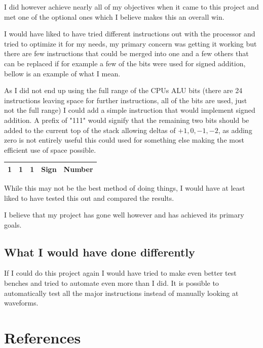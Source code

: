 \documentclass	[a4paper, 10pt]	{article}
\begin{document}
    I did however achieve nearly all of my objectives when it came to this project and
    met one of the optional ones which I believe makes this an overall win.

    I would have liked to have tried different instructions out with the processor and
    tried to optimize it for my needs, my primary concern was getting it working but
    there are few instructions that could be merged into one and a few others that can
    be replaced if for example a few of the bits were used for signed addition, bellow
    is an example of what I mean.

    As I did not end up using the full range of the CPUs ALU bits (there are 24 instructions
    leaving space for further instructions, all of the bits are used, just not the full range)
    I could add a simple instruction that would implement signed addition. A prefix of "111"
    would signify that the remaining two bits should be added to the current top of the stack
    allowing deltas of $+1,0,-1,-2$, as adding zero is not entirely useful this could used for
    something else making the most efficient use of space possible.

    \begin{center}
      \begin{tabular}{l | c | c | c | r }
        \hline
        1 & 1 & 1 & Sign & Number \\
        \hline
      \end{tabular}
    \end{center}

    While this may not be the best method of doing things, I would have at least liked to
    have tested this out and compared the results.

    I believe that my project has gone well however and has achieved its primary goals.

    \subsection{What I would have done differently}

    If I could do this project again I would have tried to make even better test benches
    and tried to automate even more than I did. It is possible to automatically test all
    the major instructions instead of manually looking at waveforms.

  \section{References}
\end{document}
